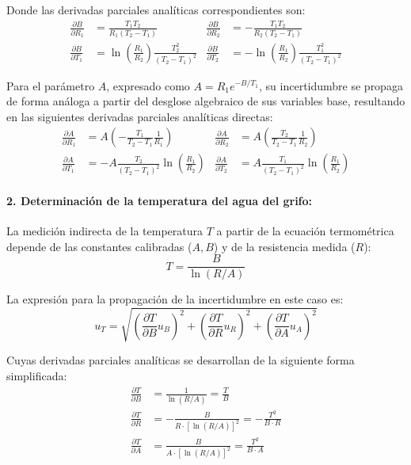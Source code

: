 \documentclass[11pt,a4paper]{article}
\begin{document}
Donde las derivadas parciales analíticas correspondientes son:
\begin{align}
\frac{\partial B}{\partial R_1} &= \frac{T_1 T_2}{R_1(T_2 - T_1)} & \frac{\partial B}{\partial R_2} &= -\frac{T_1 T_2}{R_2(T_2 - T_1)} \\
\frac{\partial B}{\partial T_1} &= \ln\left(\frac{R_1}{R_2}\right) \frac{T_2^2}{(T_2 - T_1)^2} & \frac{\partial B}{\partial T_2} &= -\ln\left(\frac{R_1}{R_2}\right) \frac{T_1^2}{(T_2 - T_1)^2}
\end{align}

Para el parámetro $A$, expresado como $A = R_1 e^{-B/T_1}$, su incertidumbre se propaga de forma análoga a partir del desglose algebraico de sus variables base, resultando en las siguientes derivadas parciales analíticas directas:
\begin{align}
\frac{\partial A}{\partial R_1} &= A \left( -\frac{T_1}{T_2 - T_1} \frac{1}{R_1} \right) & \frac{\partial A}{\partial R_2} &= A \left( \frac{T_2}{T_2 - T_1} \frac{1}{R_2} \right) \\
\frac{\partial A}{\partial T_1} &= -A \frac{T_2}{(T_2 - T_1)^2} \ln\left(\frac{R_1}{R_2}\right) & \frac{\partial A}{\partial T_2} &= A \frac{T_1}{(T_2 - T_1)^2} \ln\left(\frac{R_1}{R_2}\right)
\end{align}

\paragraph{2. Determinación de la temperatura del agua del grifo:}
La medición indirecta de la temperatura $T$ a partir de la ecuación termométrica depende de las constantes calibradas ($A, B$) y de la resistencia medida ($R$):
\begin{equation}
T = \frac{B}{\ln(R/A)}
\end{equation}

La expresión para la propagación de la incertidumbre en este caso es:
\begin{equation}
u_T = \sqrt{\left(\frac{\partial T}{\partial B} u_B\right)^2 + \left(\frac{\partial T}{\partial R} u_R\right)^2 + \left(\frac{\partial T}{\partial A} u_A\right)^2}
\end{equation}

Cuyas derivadas parciales analíticas se desarrollan de la siguiente forma simplificada:
\begin{align}
\frac{\partial T}{\partial B} &= \frac{1}{\ln(R/A)} = \frac{T}{B} \\
\frac{\partial T}{\partial R} &= -\frac{B}{R \cdot [\ln(R/A)]^2} = -\frac{T^2}{B \cdot R} \\
\frac{\partial T}{\partial A} &= \frac{B}{A \cdot [\ln(R/A)]^2} = \frac{T^2}{B \cdot A}
\end{align}
\end{document}
